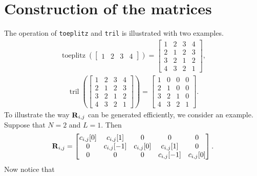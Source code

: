 \documentclass[a4paper, openany, oneside]{memoir}
\begin{document}
\chapter{Construction of the matrices}
\label{sec:reconstruction-generation-algorithm}
The operation of \texttt{toeplitz} and \texttt{tril} is illustrated with two examples.
\begin{align*}
    \operatorname{toeplitz}\left(\begin{bmatrix}
        1 & 2 & 3 & 4
    \end{bmatrix}\right) = \begin{bmatrix}
        1 & 2 & 3 & 4 \\
        2 & 1 & 2 & 3 \\
        3 & 2 & 1 & 2 \\
        4 & 3 & 2 & 1
    \end{bmatrix},
\end{align*}
\begin{align*}
    \operatorname{tril}\left(\begin{bmatrix}
        1 & 2 & 3 & 4 \\
        2 & 1 & 2 & 3 \\
        3 & 2 & 1 & 2 \\
        4 & 3 & 2 & 1
    \end{bmatrix}\right) = \begin{bmatrix}
        1 & 0 & 0 & 0 \\
        2 & 1 & 0 & 0 \\
        3 & 2 & 1 & 0 \\
        4 & 3 & 2 & 1
    \end{bmatrix}.
\end{align*}
To illustrate the way $\boldsymbol{\mathbf{R}}_{i,j}$ can be generated efficiently, we consider an example. Suppose that $N=2$ and $L=1$. Then
\begin{align*}
    \boldsymbol{\mathbf{R}}_{i,j} = \begin{bmatrix}
        c_{i,j}[0] & c_{i,j}[1] & 0 & 0 & 0 \\
        0 & c_{i,j}[-1] & c_{i,j}[0] & c_{i,j}[1] & 0 \\
        0 & 0 & 0 & c_{i,j}[-1] & c_{i,j}[0] \\
    \end{bmatrix}.
\end{align*}
Now notice that
\end{document}
